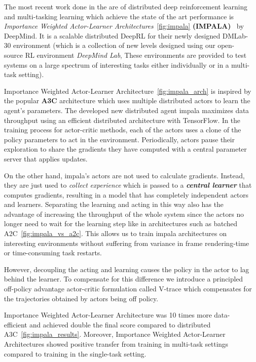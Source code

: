 The most recent work done in the are of distributed deep reinforcement learning and multi-tasking learning which achieve the state of the art performance is \textit{Importance Weighted Actor-Learner Architectures}~\ref{fig:impala} \textbf{(IMPALA)}~\parencite{espeholt2018impala} by DeepMind. It is a scalable distributed DeepRL for their newly designed DMLab-30 environment (which is a collection of new levels designed using our open-source RL environment \textit{DeepMind Lab}, These environments are provided to test systems on a large spectrum of interesting tasks either individually or in a multi-task setting).

Importance Weighted Actor-Learner Architecture~\ref{fig:impala_arch} is inspired by the popular \textbf{A3C} architecture which uses multiple distributed actors to learn the agent’s parameters. The developed new distributed agent impala maximizes data throughput using an efficient distributed architecture with TensorFlow. 
In the training process for actor-critic methods, each of the actors uses a clone of the policy parameters to act in the environment. Periodically, actors pause their exploration to share the gradients they have computed with a central parameter server that applies updates. 

On the other hand, impala's actors are not used to calculate gradients. Instead, they are just used to \textit{collect experience} which is passed to a \textit{\textbf{central learner}} that computes gradients, resulting in a model that has completely independent actors and learners. 
Separating the learning and acting in this way also has the advantage of increasing the throughput of the whole system since the actors no longer need to wait for the learning step like in architectures such as batched A2C~\ref{fig:impala_vs_a2c}. This allows us to train impala architectures on interesting environments without suffering from variance in frame rendering-time or time-consuming task restarts.

However, decoupling the acting and learning causes the policy in the actor to lag behind the learner. To compensate for this difference we introduce a principled off-policy advantage actor-critic formulation called V-trace which compensates for the trajectories obtained by actors being off policy.

Importance Weighted Actor-Learner Architecture was 10 times more data-efficient and achieved double the final score compared to distributed A3C~\ref{fig:impala_results}. Moreover, Importance Weighted Actor-Learner Architectures showed positive transfer from training in multi-task settings compared to training in the single-task setting.


